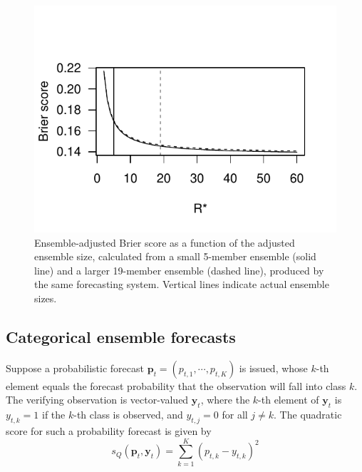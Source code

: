 \documentclass[article]{jss}\usepackage{graphicx, color}
\makeatletter
\def\maxwidth{ %
  \ifdim\Gin@nat@width>\linewidth
    \linewidth
  \else
    \Gin@nat@width
  \fi
}
\newenvironment{knitrout}{}{} %
\makeatother
\begin{document}
\begin{figure}
\begin{center}
\begin{knitrout}
\color{fgcolor}
\includegraphics[width=\maxwidth]{figure/ens-brier} 

\end{knitrout}

\caption{Ensemble-adjusted Brier score as a function of the adjusted ensemble size, calculated from a small 5-member ensemble (solid line) and a larger 19-member ensemble (dashed line), produced by the same forecasting system. Vertical lines indicate actual ensemble sizes.} 
\label{fig:ens-brier}
\end{center}
\end{figure}




\subsection{Categorical ensemble forecasts}


Suppose a probabilistic forecast $\mathbf{p}_t = (p_{t,1}, \cdots, p_{t,K})$ is issued, whose $k$-th element equals the forecast probability that the observation will fall into class $k$.
The verifying observation is vector-valued $\mathbf{y}_t$, where the $k$-th element of $\mathbf{y}_t$ is $y_{t,k}=1$ if the $k$-th class is observed, and $y_{t,j}=0$ for all $j\neq k$. 
The quadratic score for such a probability forecast is given by
%
\begin{equation}
s_{Q}(\mathbf{p}_t, \mathbf{y}_t) = \sum_{k=1}^K \left(p_{t,k} - y_{t,k}\right)^2
\end{equation}
\end{document}
